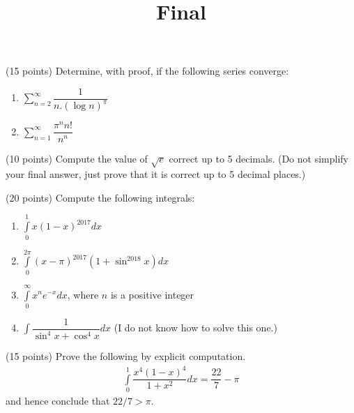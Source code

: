 \documentclass[9pt, a4paper, oneside, reqno]{amsart}
\title{Final}
\begin{document}
\maketitle
\thispagestyle{fancy}


\begin{questions}

	\item (15 points) Determine, with proof, if the following series converge:
	\begin{multicols}{2}
		\begin{enumerate}
			\item $\sum \limits_{n = 2}^{\infty}  \dfrac{1}{n.(\log n)^\pi}$
			\item $ \sum \limits_{n = 1}^{\infty}  \dfrac{\pi^n n!}{n^n}$
		\end{enumerate}
	\end{multicols}

	\item (10 points) Compute the value of $\sqrt{e}$ correct up to 5 decimals. (Do not simplify your final answer, just prove that it is correct up to 5 decimal places.)

	\item(20 points) Compute the following integrals:
	\begin{enumerate}
		\item $ \int \limits_0^1 x (1 - x)^{2017} dx$
		\item $ \int \limits_0^{2 \pi} (x - \pi)^{2017} (1 + \sin ^{2018} x) dx$
		\item $ \int \limits_0^{\infty} x^n e^{-x} dx$, where $ n$ is a positive integer
		\item $\int \dfrac{1}{\sin^4 x + \cos^4 x} dx$ (I do not know how to solve this one.)
	\end{enumerate}

	\item (15 points) Prove the following by explicit computation.
	\begin{align*}
		\int \limits_0^1 \dfrac{x^4(1-x)^4}{1 + x^2} dx = \dfrac{22}{7} - \pi
	\end{align*}
	and hence conclude that $ 22/7 > \pi$.




\end{questions}
\end{document}
